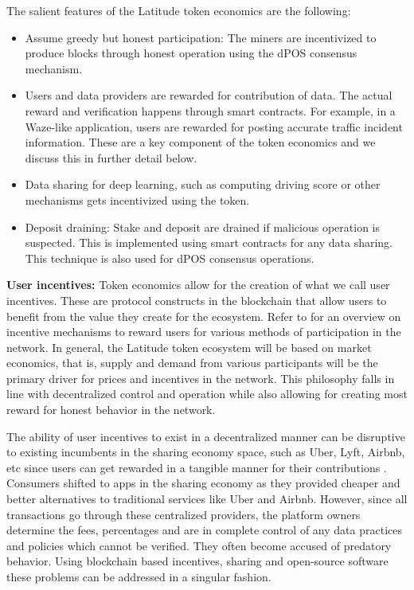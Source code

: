 The salient features of the Latitude token economics are the following:
\begin{itemize}
    \item Assume greedy but honest participation: The miners are incentivized to produce blocks through honest operation
        using the dPOS consensus mechanism.
    \item Users and data providers are rewarded for contribution of data. The actual reward and verification happens
        through smart contracts. For example, in a Waze-like application, users are rewarded for posting accurate
        traffic incident information. These are a key component of the token economics and we discuss this in further
        detail below.
    \item Data sharing for deep learning, such as computing driving score or other mechanisms gets incentivized using
        the token.
    \item Deposit draining: Stake and deposit are drained if malicious operation is suspected. This is implemented using
        smart contracts for any data sharing. This technique is also used for dPOS consensus operations.
\end{itemize}


\noindent
{\bf User incentives:}
Token economics allow for the creation of what we call user incentives. These are protocol constructs in the blockchain
that allow users to benefit from the value they create for the ecosystem. Refer to \cite{token_ecos} for an overview on
incentive mechanisms to reward users for various methods of participation in the network. In general, the Latitude token
ecosystem will be based on market economics, that is, supply and demand from various participants will be the primary
driver for prices and incentives in the network. This philosophy falls in line with decentralized control and operation
while also allowing for creating most reward for honest behavior in the network.

The ability of user incentives to exist in a decentralized manner can be disruptive to existing incumbents in the
sharing economy space, such as Uber, Lyft, Airbnb, etc since users can get rewarded in a tangible manner for their
contributions \cite{sharing_eco_bc}. Consumers shifted to apps in the sharing economy as they provided cheaper and
better alternatives to traditional services like Uber and Airbnb. However, since all transactions go through these
centralized providers, the platform owners determine the fees, percentages and are in complete control of any data
practices and policies which cannot be verified. They often become accused of predatory behavior. Using blockchain based
incentives, sharing and open-source software these problems can be addressed in a singular fashion.

